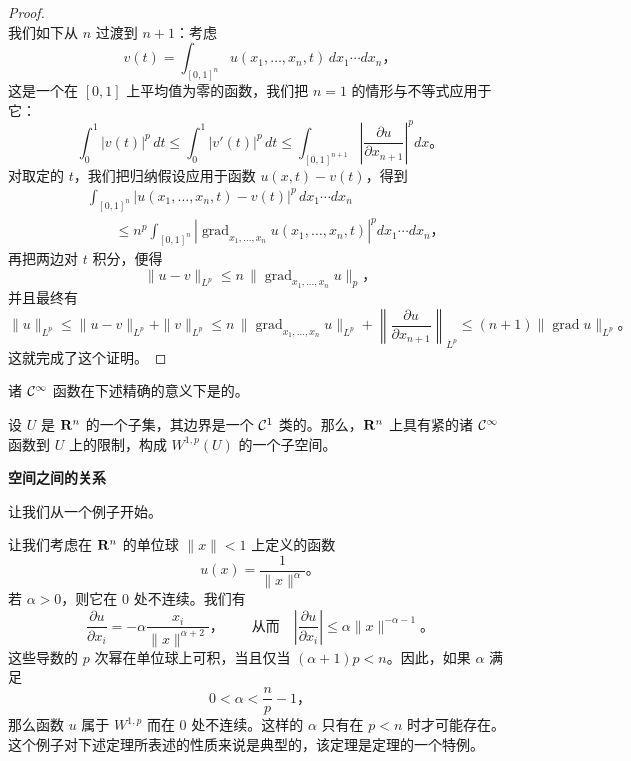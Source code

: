 \begin{proof}
\[\]
我们如下从 $n$ 过渡到 $n+1$：考虑
\[
v(t)=\int_{[0,1]^{n}}u(x_{1},\dotsc,x_{n},t)\,dx_{1}\cdots dx_{n}\text{，}
\]
这是一个在 $[0,1]$ 上平均值为零的函数，我们把 $n=1$ 的情形与\trHoelder{}不等式应用于它：
\[
\int_{0}^{1}|v(t)|^{p}\,dt\le\int_{0}^{1}|v'(t)|^{p}\,dt
\le\int_{[0,1]^{n+1}}\left|\frac{\partial u}{\partial x_{n+1}}\right|^{p}dx\text{。}
\]
对取定的 $t$，我们把归纳假设应用于函数 $u(x,t)-v(t)$，得到
\[
\begin{aligned}
&\int_{[0,1]^{n}}|u(x_{1},\dotsc,x_{n},t)-v(t)|^{p}\,dx_{1}\cdots dx_{n}\\
&\qquad\le n^{p}\int_{[0,1]^{n}}\left|\operatorname{grad}_{x_{1},\dotsc,x_{n}}u(x_{1},\dotsc,x_{n},t)\right|^{p}dx_{1}\cdots dx_{n}\text{，}
\end{aligned}
\]
再把两边对 $t$ 积分，便得
\[
\|u-v\|_{L^{p}}\le n\,\|\operatorname{grad}_{x_{1},\dotsc,x_{n}}u\|_{p}\text{，}
\]
并且最终有
\[
\|u\|_{L^{p}}
\le\|u-v\|_{L^{p}}+\|v\|_{L^{p}}
\le n\,\|\operatorname{grad}_{x_{1},\dotsc,x_{n}}u\|_{L^{p}}+\left\|\frac{\partial u}{\partial x_{n+1}}\right\|_{L^{p}}
\le(n+1)\|\operatorname{grad}u\|_{L^{p}}\text{。}
\]
这就完成了这个证明。
\end{proof}

诸 $\mathcal{C}^{\infty}$ 函数在下述精确的意义下是\trDense{}的。

\begin{proposition}[{参见 [17,~Section~9.3]}]\label{thm:dense-restrictions}
设 $U$ 是 $\mathbf{R}^{n}$ 的一个\trOpen{}子集，其边界是一个 $\mathcal{C}^{1}$ 类的\trSubmanifold。那么，$\mathbf{R}^{n}$ 上具有紧\trSupport{}的诸 $\mathcal{C}^{\infty}$ 函数到 $U$ 上的限制，构成 $W^{1,p}(U)$ 的一个\trDense{}子空间。
\end{proposition}

\noindent\textbf{\trSobolev{}空间之间的关系}

让我们从一个例子开始。

\begin{example}\label{thm:example-singular-sobolev}
让我们考虑在 $\mathbf{R}^{n}$ 的单位球 $\|x\|<1$ 上定义的函数
\[
u(x)=\frac{1}{\|x\|^{\alpha}}\text{。}
\]
若 $\alpha>0$，则它在 $0$ 处不连续。我们有
\[
\frac{\partial u}{\partial x_{i}}=-\alpha\frac{x_{i}}{\|x\|^{\alpha+2}}\text{，}
\qquad\text{从而}\quad
\left|\frac{\partial u}{\partial x_{i}}\right|\le\alpha\|x\|^{-\alpha-1}\text{。}
\]
这些导数的 $p$ 次幂在单位球上可积，当且仅当 $(\alpha+1)p<n$。因此，如果 $\alpha$ 满足
\[
0<\alpha<\frac{n}{p}-1\text{，}
\]
那么函数 $u$ 属于 $W^{1,p}$ 而在 $0$ 处不连续。这样的 $\alpha$ 只有在 $p<n$ 时才可能存在。这个例子对下述定理所表述的性质来说是典型的，该定理是\trRellich{}定理的一个特例。
\end{example}

